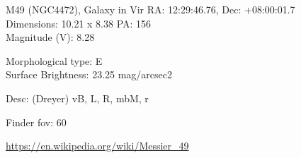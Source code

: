 \begin{block}{M49 (NGC4472), Galaxy in Vir}
    RA: 12:29:46.76, Dec: +08:00:01.7 \\ 
    Dimensions: 10.21 x 8.38 PA: 156 \\ 
    Magnitude (V): 8.28

    Morphological type: E \\ 
    Surface Brightness: 23.25 mag/arcsec2 

    Desc: (Dreyer) vB, L, R, mbM, r 

    Finder fov: 60 

    \url{https://en.wikipedia.org/wiki/Messier_49} 
\end{block}